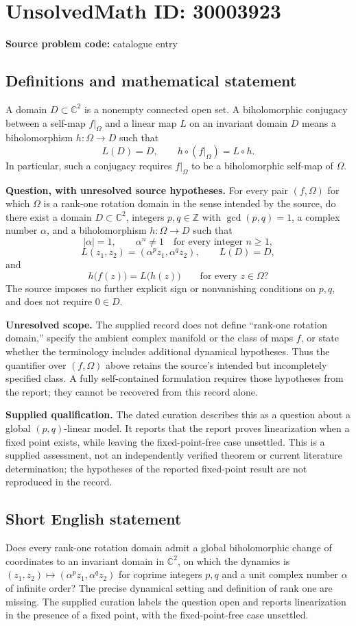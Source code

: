 \documentclass[11pt]{article}
\newcommand{\Z}{\mathbb{Z}}
\newcommand{\C}{\mathbb{C}}
\begin{document}
\section*{UnsolvedMath ID: 30003923}
\textbf{Source problem code:} catalogue entry
\subsection{Definitions and mathematical statement}
A domain \(D\subset\C^2\) is a nonempty connected open set. A biholomorphic conjugacy between a self-map \(f|_\Omega\) and a linear map \(L\) on an invariant domain \(D\) means a biholomorphism \(h:\Omega\to D\) such that
\[
L(D)=D,\qquad h\circ(f|_\Omega)=L\circ h.
\]
In particular, such a conjugacy requires \(f|_\Omega\) to be a biholomorphic self-map of \(\Omega\).

\textbf{Question, with unresolved source hypotheses.} For every pair \((f,\Omega)\) for which \(\Omega\) is a rank-one rotation domain in the sense intended by the source, do there exist a domain \(D\subset\C^2\), integers \(p,q\in\Z\) with \(\gcd(p,q)=1\), a complex number \(\alpha\), and a biholomorphism \(h:\Omega\to D\) such that
\[
|\alpha|=1,\qquad \alpha^n\ne1\quad\text{for every integer }n\ge1,
\]
\[
L(z_1,z_2)=(\alpha^p z_1,\alpha^q z_2),\qquad L(D)=D,
\]
and
\[
h\bigl(f(z)\bigr)=L\bigl(h(z)\bigr)\qquad\text{for every }z\in\Omega?
\]
The source imposes no further explicit sign or nonvanishing conditions on \(p,q\), and does not require \(0\in D\).

\textbf{Unresolved scope.} The supplied record does not define ``rank-one rotation domain,'' specify the ambient complex manifold or the class of maps \(f\), or state whether the terminology includes additional dynamical hypotheses. Thus the quantifier over \((f,\Omega)\) above retains the source's intended but incompletely specified class. A fully self-contained formulation requires those hypotheses from the report; they cannot be recovered from this record alone.

\textbf{Supplied qualification.} The dated curation describes this as a question about a global \((p,q)\)-linear model. It reports that the report proves linearization when a fixed point exists, while leaving the fixed-point-free case unsettled. This is a supplied assessment, not an independently verified theorem or current literature determination; the hypotheses of the reported fixed-point result are not reproduced in the record.
\subsection{Short English statement}
Does every rank-one rotation domain admit a global biholomorphic change of coordinates to an invariant domain in \(\C^2\), on which the dynamics is \((z_1,z_2)\mapsto(\alpha^p z_1,\alpha^q z_2)\) for coprime integers \(p,q\) and a unit complex number \(\alpha\) of infinite order? The precise dynamical setting and definition of rank one are missing. The supplied curation labels the question open and reports linearization in the presence of a fixed point, with the fixed-point-free case unsettled.
\end{document}
